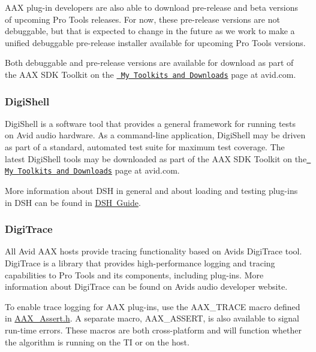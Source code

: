 A\+AX plug-\/in developers are also able to download pre-\/release and beta versions of upcoming Pro Tools releases. For now, these pre-\/release versions are not debuggable, but that is expected to change in the future as we work to make a unified debuggable pre-\/release installer available for upcoming Pro Tools versions.

Both debuggable and pre-\/release versions are available for download as part of the A\+AX S\+DK Toolkit on the \href{https://my.avid.com/products/cppsdk}{\texttt{ My Toolkits and Downloads}} page at avid.\+com.

\hypertarget{a00830_subsection__digishell}{}\subsubsection{Digi\+Shell}\label{a00830_subsection__digishell}
 Digi\+Shell is a software tool that provides a general framework for running tests on Avid audio hardware. As a command-\/line application, Digi\+Shell may be driven as part of a standard, automated test suite for maximum test coverage. The latest Digi\+Shell tools may be downloaded as part of the A\+AX S\+DK Toolkit on the \href{https://my.avid.com/products/cppsdk}{\texttt{ My Toolkits and Downloads}} page at avid.\+com.

More information about D\+SH in general and about loading and testing plug-\/ins in D\+SH can be found in \mbox{\hyperlink{a00835}{D\+SH Guide}}.

\hypertarget{a00830_subsection__digitrace}{}\subsubsection{Digi\+Trace}\label{a00830_subsection__digitrace}
 All Avid A\+AX hosts provide tracing functionality based on Avid\textquotesingle{}s Digi\+Trace tool. Digi\+Trace is a library that provides high-\/performance logging and tracing capabilities to Pro Tools and its components, including plug-\/ins. More information about Digi\+Trace can be found on Avid\textquotesingle{}s audio developer website.

To enable trace logging for A\+AX plug-\/ins, use the {\ttfamily A\+A\+X\+\_\+\+T\+R\+A\+CE} macro defined in {\ttfamily \mbox{\hyperlink{a00395}{A\+A\+X\+\_\+\+Assert.\+h}}}. A separate macro, {\ttfamily A\+A\+X\+\_\+\+A\+S\+S\+E\+RT}, is also available to signal run-\/time errors. These macros are both cross-\/platform and will function whether the algorithm is running on the TI or on the host.

